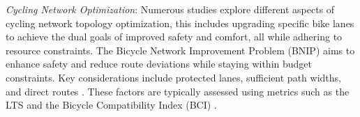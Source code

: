 \documentclass[lettersize,journal]{IEEEtran}
\begin{document}
  \textit{Cycling Network Optimization}: Numerous studies explore different aspects of cycling network topology optimization, this includes upgrading specific bike lanes to achieve the dual goals of improved safety and comfort, all while adhering to resource constraints. The Bicycle Network Improvement Problem (BNIP) aims to enhance safety and reduce route deviations while staying within budget constraints. Key considerations include protected lanes, sufficient path widths, and direct routes \cite{schroter2021guidance, nesmachnow2024assessment}. These factors are typically assessed using metrics such as the LTS and the Bicycle Compatibility Index (BCI) \cite{crist2019fear, campisi2020cycling}.

\end{document}
